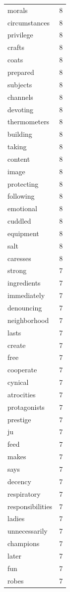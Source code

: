 \begin{tabular}{lr}
morals & 8 \\
circumstances & 8 \\
privilege & 8 \\
crafts & 8 \\
coats & 8 \\
prepared & 8 \\
subjects & 8 \\
channels & 8 \\
devoting & 8 \\
thermometers & 8 \\
building & 8 \\
taking & 8 \\
content & 8 \\
image & 8 \\
protecting & 8 \\
following & 8 \\
emotional & 8 \\
cuddled & 8 \\
equipment & 8 \\
salt & 8 \\
caresses & 8 \\
strong & 7 \\
ingredients & 7 \\
immediately & 7 \\
denouncing & 7 \\
neighborhood & 7 \\
lasts & 7 \\
create & 7 \\
free & 7 \\
cooperate & 7 \\
cynical & 7 \\
atrocities & 7 \\
protagonists & 7 \\
prestige & 7 \\
ju & 7 \\
feed & 7 \\
makes & 7 \\
says & 7 \\
decency & 7 \\
respiratory & 7 \\
responsibilities & 7 \\
ladies & 7 \\
unnecessarily & 7 \\
champions & 7 \\
later & 7 \\
fun & 7 \\
robes & 7 \\

\end{tabular}
